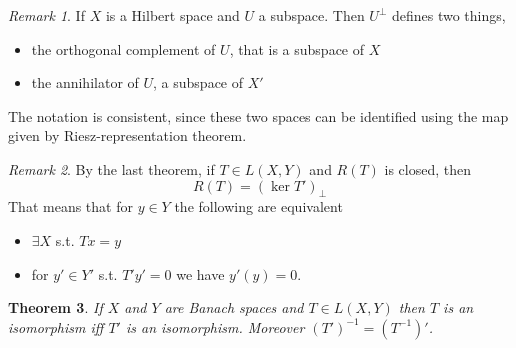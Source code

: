 \documentclass[a4paper, 12pt]{article}
\theoremstyle{plain}
\newtheorem{theorem}{Theorem}[subsection] %
\theoremstyle{definition}
\theoremstyle{lemma}
\theoremstyle{remark}
\newtheorem{remark}[theorem]{Remark}
\theoremstyle{corollary}
\theoremstyle{example}
\begin{document}
	\begin{remark}
		If $X$ is a Hilbert space and $U$ a subspace. Then $U^\bot$ defines two things, \begin{itemize}
			\item the orthogonal complement of $U$, that is a subspace of $X$
			\item the annihilator of $U$, a subspace of $X'$
		\end{itemize}
		The notation is consistent, since these two spaces can be identified using the map given by Riesz-representation theorem.
	\end{remark}
	\begin{remark}
		By the last theorem, if $T\in L(X,Y)$ and $R(T)$ is closed, then \[R(T) = (\ker T')_\bot\]
		That means that for $y\in Y$ the following are equivalent \begin{itemize}
			\item $\exists X$ s.t. $Tx = y$
			\item for $y'\in Y'$ s.t. $T'y' = 0$ we have $y'(y) = 0$.
		\end{itemize}
	\end{remark}
	\begin{theorem}
		If $X$ and $Y$ are Banach spaces and $T \in L(X,Y)$ then $T$ is an isomorphism iff $T'$ is an isomorphism. Moreover $(T')^{-1} = (T^{-1})'$.
	\end{theorem}
\end{document}
